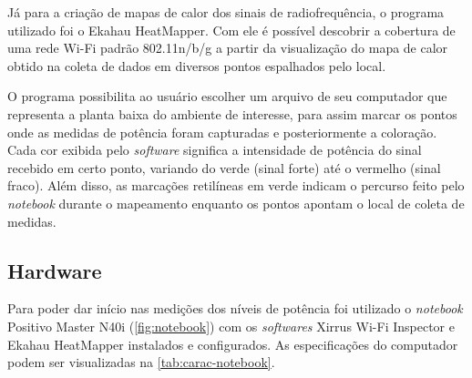 Já para a criação de mapas de calor dos sinais de radiofrequência, o programa utilizado foi o Ekahau HeatMapper. Com ele é possível descobrir a cobertura de uma rede Wi-Fi padrão 802.11n/b/g a partir da visualização do mapa de calor obtido na coleta de dados em diversos pontos espalhados pelo local.

O programa possibilita ao usuário escolher um arquivo de seu computador que representa a planta baixa do ambiente de interesse, para assim marcar os pontos onde as medidas de potência foram capturadas e posteriormente a coloração. Cada cor exibida pelo \textit{software} significa a intensidade de potência do sinal recebido em certo ponto, variando do verde (sinal forte) até o vermelho (sinal fraco). Além disso, as marcações retilíneas em verde indicam o percurso feito pelo \textit{notebook} durante o mapeamento enquanto os pontos apontam o local de coleta de medidas. %


\subsection{Hardware}
\label{subsec:equipamento-utilizado}

Para poder dar início nas medições dos níveis de potência foi utilizado o \textit{notebook} Positivo Master N40i (\autoref{fig:notebook}) com os \textit{softwares} Xirrus Wi-Fi Inspector e Ekahau HeatMapper instalados e configurados. As especificações do computador podem ser visualizadas na \autoref{tab:carac-notebook}.

\begin{figure}[H]
	\centering
\end{figure}

